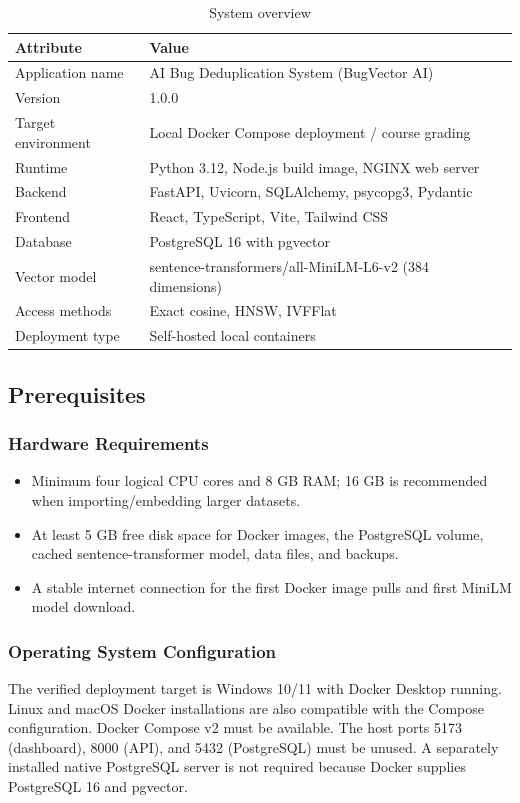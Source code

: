 \documentclass[conference]{IEEEtran}
\begin{document}
\begin{table}[!t]
\caption{System overview}
\label{tab:overview}
\centering
\begin{tabular}{p{}p{}}
\toprule
\textbf{Attribute} & \textbf{Value}\\
\midrule
Application name & AI Bug Deduplication System (BugVector AI)\\
Version & 1.0.0\\
Target environment & Local Docker Compose deployment / course grading\\
Runtime & Python 3.12, Node.js build image, NGINX web server\\
Backend & FastAPI, Uvicorn, SQLAlchemy, psycopg3, Pydantic\\
Frontend & React, TypeScript, Vite, Tailwind CSS\\
Database & PostgreSQL 16 with pgvector\\
Vector model & sentence-transformers/all-MiniLM-L6-v2 (384 dimensions)\\
Access methods & Exact cosine, HNSW, IVFFlat\\
Deployment type & Self-hosted local containers\\
\bottomrule
\end{tabular}
\end{table}

\subsection{Prerequisites}
\subsubsection{Hardware Requirements}
\begin{itemize}
\item Minimum four logical CPU cores and 8 GB RAM; 16 GB is recommended when importing/embedding larger datasets.
\item At least 5 GB free disk space for Docker images, the PostgreSQL volume, cached sentence-transformer model, data files, and backups.
\item A stable internet connection for the first Docker image pulls and first MiniLM model download.
\end{itemize}

\subsubsection{Operating System Configuration}
The verified deployment target is Windows 10/11 with Docker Desktop running. Linux and macOS Docker installations are also compatible with the Compose configuration. Docker Compose v2 must be available. The host ports 5173 (dashboard), 8000 (API), and 5432 (PostgreSQL) must be unused. A separately installed native PostgreSQL server is not required because Docker supplies PostgreSQL 16 and pgvector.
\end{document}
